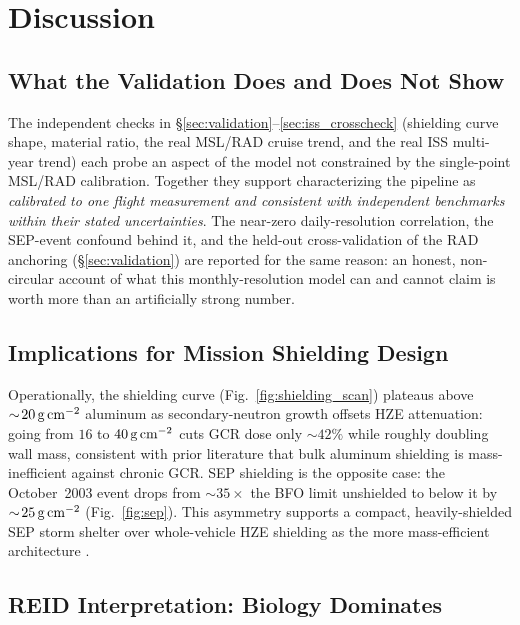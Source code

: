 
\section{Discussion}
\label{sec:discussion}

\subsection{What the Validation Does and Does Not Show}
\label{sec:discuss_validation}

The independent checks in \S\ref{sec:validation}--\ref{sec:iss_crosscheck}
(shielding curve shape, material ratio, the real MSL/RAD cruise trend, and
the real ISS multi-year trend) each probe an aspect of the model not
constrained by the single-point MSL/RAD calibration. Together they support
characterizing the pipeline as \emph{calibrated to one flight measurement
and consistent with independent benchmarks within their stated
uncertainties}. The
near-zero daily-resolution correlation, the SEP-event confound behind it,
and the held-out cross-validation of the RAD anchoring (\S\ref{sec:validation})
are reported for the same reason: an honest, non-circular account of what
this monthly-resolution model can and cannot claim is worth more than an
artificially strong number.

\subsection{Implications for Mission Shielding Design}
\label{sec:discuss_shielding}

Operationally, the
shielding curve (Fig.~\ref{fig:shielding_scan}) plateaus above
$\sim\!20\,\mathrm{g\,cm^{-2}}$ aluminum as secondary-neutron growth offsets HZE
attenuation: going from $16$ to $40\,\mathrm{g\,cm^{-2}}$ cuts GCR dose only
$\sim\!42\%$ while roughly doubling wall mass, consistent with prior
literature \citep{cucinotta2006, slaba2014} that bulk aluminum shielding
is mass-inefficient against chronic GCR. SEP shielding is the opposite
case: the October~2003 event drops from $\sim\!35\times$ the BFO limit
unshielded to below it by $\sim\!25\,\mathrm{g\,cm^{-2}}$ (Fig.~\ref{fig:sep}). This
asymmetry supports a compact, heavily-shielded SEP storm shelter over
whole-vehicle HZE shielding as the more mass-efficient architecture
\citep{durante2011, cucinotta2010}.

\subsection{REID Interpretation: Biology Dominates}
\label{sec:discuss_reid}

